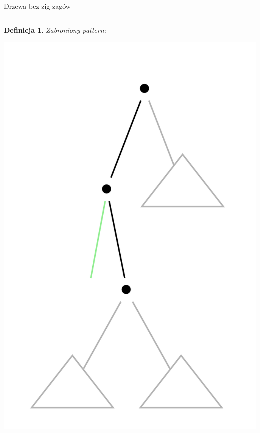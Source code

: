 \documentclass[final]{beamer}
\theoremstyle{bluetheorem}
\theoremstyle{bluetheorem}
\newtheorem{mydefinition}[mytheorem]{Definicja}
\theoremstyle{greentheorem}
\begin{document}
\begin{frame}{Drzewa bez zig-zagów}
    \begin{columns}
        \begin{mydefinition}
            Zabroniony pattern:
            \begin{center}
                \includegraphics[height=\textwidth]{zigzag_forbid.png}
            \end{center}
        \end{mydefinition}


\end{columns}
\end{frame}
\end{document}
